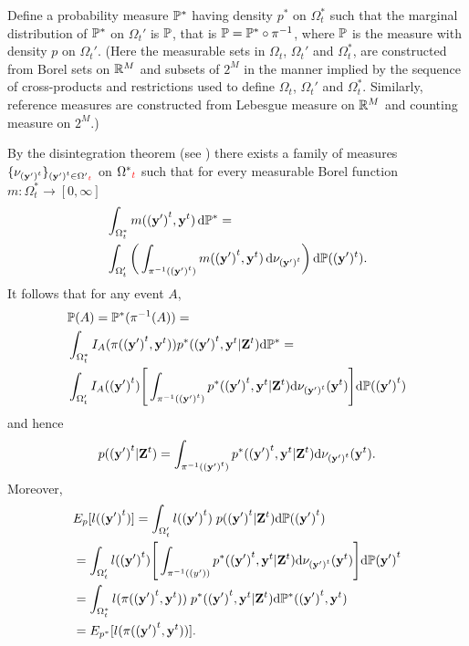 \begin{appendix}
Define a probability measure $\P^*$ having density $p^*$ on $\Omega^*_t$ such that the marginal distribution of $\P^*$ on $\Omega_t'$ is $\P$, that is $\P = \P^* \circ \pi^{-1}$, where $\P$ is the measure with density $p$ on $\Omega_t'$. (Here the measurable sets in $\Omega_t$, $\Omega_t'$ and $\Omega_t^*$, are constructed from Borel sets on $\Real^M$ and subsets of $2^M$ in the manner implied by the sequence of cross-products and restrictions used to define $\Omega_t$, $\Omega_t'$ and $\Omega_t^*$. Similarly, reference measures are constructed from Lebesgue measure on $\Real^M$ and counting measure on $2^M$.)

By the disintegration theorem (see \cite{Rohlin}) there exists a family of measures $\{ \nu_{\vec{(y')}^t} \}_{\vec{(y')}^t \in \Omega'{\color{red}_t}}$ on $\Omega^*{\color{red}_t}$ such that for every measurable Borel function $m : \Omega^*_t \rightarrow [0, \infty]$
\begin{align*}
    &\int_{\Omega^*_t} m(\vec{(y')}^t, \vec{y}^t)\diff \P^* = \\
    & \int_{\Omega_t'} \bigg( \int_{\pi^{-1}(\vec{(y')}^t)} m(\vec{(y')}^t, \vec{y}^t) \diff \nu_{\vec{(y')}^t}  \bigg) \diff \P((\vec{y'})^t).
\end{align*}
It follows that for any event $A$,
\begin{align*}
    &\P(A) = \P^{*}(\pi^{-1}(A)) = \\
    &\int_{\Omega_t^*} I_A(\pi(\vec{(y')}^t, \vec{y}^t)) p^*(\vec{(y')}^t, \vec{y}^t | \vec{Z}^t) \D \P^*  = \\
    & \int_{\Omega_t'} I_A(\vec{(y')}^t) \Bigg[ \int_{\pi^{-1}(\vec{(y')}^t)} p^*(\vec{(y')}^t, \vec{y}^t | \vec{Z}^t) \D \nu_{\vec{(y')}^t} (\vec{y}^t) \Bigg] \D \P (\vec{(y')}^t)
\end{align*}
and hence
\begin{equation*}
    p(\vec{(y')}^t | \vec{Z}^t) = \int_{\pi^{-1}(\vec{(y')}^t)} p^*(\vec{(y')}^t, \vec{y}^t | \vec{Z}^t) \D \nu_{\vec{(y')}^t}(\vec{y}^t).
\end{equation*}
Moreover,
\begin{align*}
    &E_{p}[l(\vec{(y')}^{t})]  = \int_{\Omega_t'} l(\vec{(y')}^{t})\; p(\vec{(y')}^{t} | \vec{Z}^{t}) \D \P (\vec{(y')}^{t}) \\
    &= \int_{\Omega_t'} l(\vec{(y')}^{t})\Bigg[\int_{\pi^{-1}(\vec(y'))} p^*(\vec{(y')}^{t}, \vec{y}^{t} | \vec{Z}^{t}) \D \nu_{\vec{(y')}^t}(\vec{y}^t) \Bigg] \D \P \vec{(y')}^{t} \\ 
    &= \int_{\Omega_t^*} l(\pi(\vec{(y')}^{t}, \vec{y}^{t}))\; p^*(\vec{(y')}^{t}, \vec{y}^{t} | \vec{Z}^{t}) \D \P^*(\vec{(y')}^t, \vec{y}^t) \\ 
    &= E_{p^*}[l(\pi (\vec{(y')}^{t}, \vec{y}^{t}))].
\end{align*}
\end{appendix}



